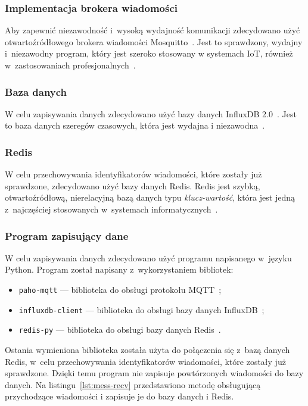 \subsubsection{Implementacja brokera wiadomości}\label{impl:mosquitto}
Aby zapewnić niezawodność i~wysoką wydajność komunikacji zdecydowano użyć otwartoźródłowego brokera wiadomości Mosquitto~\cite{tool:mosquitto}.
Jest to sprawdzony, wydajny i~niezawodny program, który jest szeroko stosowany w systemach IoT, również w~zastosowaniach profesjonalnych~\cite{tool:mosquitto}.

\subsubsection{Baza danych}\label{impl:db}
W celu zapisywania danych zdecydowano użyć bazy danych InfluxDB 2.0~\cite{tool:influxdb}. Jest to baza danych szeregów czasowych, która jest wydajna i niezawodna~\cite{tool:influxdb}.

\subsubsection{Redis}\label{impl:redis}
W celu przechowywania identyfikatorów wiadomości, które zostały już sprawdzone, zdecydowano użyć bazy danych Redis.
Redis jest szybką, otwartoźródłową, nierelacyjną bazą danych typu \emph{klucz-wartość}, która jest jedną z~najczęściej stosowanych w~systemach informatycznych~\cite{tool:redis}.

\subsubsection{Program zapisujący dane}\label{impl:save}
W celu zapisywania danych zdecydowano użyć programu napisanego w~języku Python.
Program został napisany z~wykorzystaniem bibliotek:
\begin{itemize}
    \item \texttt{paho-mqtt} — biblioteka do obsługi protokołu MQTT~\cite{py:paho-mqtt};
    \item \texttt{influxdb-client} — biblioteka do obsługi bazy danych InfluxDB~\cite{py:influxdb};
    \item \texttt{redis-py} — biblioteka do obsługi bazy danych Redis~\cite{py:redis}.
\end{itemize}

Ostania wymieniona biblioteka została użyta do połączenia się z~bazą danych Redis, w~celu przechowywania identyfikatorów wiadomości, które zostały już sprawdzone.
Dzięki temu program nie zapisuje powtórzonych wiadomości do bazy danych.
Na listingu~\ref{lst:mess-recv} przedstawiono metodę obsługującą przychodzące wiadomości i zapisuje je do bazy danych i Redis.

